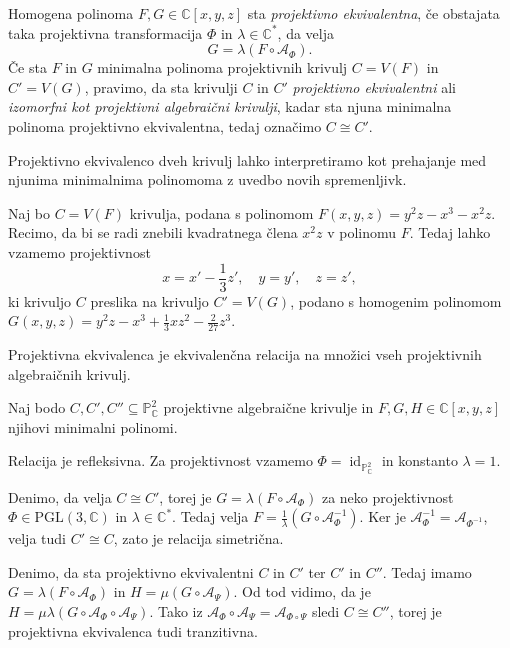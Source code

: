 \documentclass[mat1]{fmfdelo}
\numberwithin{equation}{section}
\newcommand{\C}{\mathbb C}
\newcommand{\CM}{\mathbb C ^*}
\newcommand{\PC}{\mathbb{P}^2_\C}
\newcommand{\Cxyz}{\C[x,y,z]}
\newcommand{\inv}{^{-1}}
\newcommand{\kom}[1]{
    \underline{//#1}
}
\DeclareMathOperator{\id}{id}
\theoremstyle{definition}
\begin{document}
\begin{definicija}
    Homogena polinoma $F,G \in \Cxyz$ sta \emph{projektivno ekvivalentna}, če obstajata taka projektivna transformacija $\Phi$ in $\lambda \in \CM$, da velja
    $$ G = \lambda (F \circ \mathcal{A}_\Phi). $$
    Če sta $F$ in $G$ minimalna polinoma projektivnih krivulj $C = V(F)$ in $C' = V(G)$, pravimo, da sta krivulji $C$ in $C'$ \emph{projektivno ekvivalentni} ali \emph{izomorfni kot projektivni algebraični krivulji}, kadar sta njuna minimalna polinoma projektivno ekvivalentna, tedaj označimo $C \cong C'$. 
\end{definicija}

Projektivno ekvivalenco dveh krivulj lahko interpretiramo kot prehajanje med njunima minimalnima polinomoma z uvedbo novih spremenljivk.

\begin{zgled*}
    \label{zgled projektivne ekviv.}
    Naj bo $C = V(F)$ krivulja, podana s polinomom $F(x,y,z) = y^2z - x^3 - x^2z$. Recimo, da bi se radi znebili kvadratnega člena $x^2z$ v polinomu $F$. Tedaj lahko vzamemo projektivnost 
    \[
        x = x' - \frac{1}{3}z', \quad y = y', \quad z = z',
    \]
    ki krivuljo $C$ preslika na krivuljo $C' = V(G)$, podano s homogenim polinomom $G(x,y,z) = y^2z - x^3 + \frac13 xz^2 - \frac{2}{27}z^3$. 
\end{zgled*}

\begin{trditev}
    Projektivna ekvivalenca je ekvivalenčna relacija na množici vseh projektivnih algebraičnih krivulj.
\end{trditev}

\begin{dokaz}
    Naj bodo $C, C', C'' \subseteq \PC$ projektivne algebraične krivulje in $F, G, H \in \Cxyz$ njihovi minimalni polinomi. 
    \par Relacija je refleksivna. Za projektivnost vzamemo $\Phi = \id_{\PC}$ in konstanto $\lambda = 1$. 
    \par Denimo, da velja $C \cong C'$, torej je $G = \lambda (F \circ \mathcal{A}_\Phi)$ za neko projektivnost $\Phi \in \operatorname{PGL(3, \C)}$ in $\lambda \in \CM$. Tedaj velja $F = \frac{1}{\lambda} (G \circ \mathcal{A}_\Phi\inv)$. Ker je $\mathcal{A}_\Phi\inv = \mathcal{A}_{\Phi\inv}$, velja tudi $C' \cong C$, zato je relacija simetrična. 
    \par Denimo, da sta projektivno ekvivalentni $C$ in $C'$ ter $C'$ in $C''$. Tedaj imamo $G = \lambda (F \circ \mathcal{A}_\Phi)$ in $H = \mu (G \circ \mathcal{A}_\Psi)$. Od tod vidimo, da je $H = \mu\lambda(G \circ \mathcal{A}_\Phi \circ \mathcal{A}_\Psi)$. Tako iz $\mathcal{A}_\Phi \circ \mathcal{A}_\Psi = \mathcal{A}_{\Phi \circ \Psi}$ sledi $C \cong C''$, torej je projektivna ekvivalenca tudi tranzitivna. 
\end{dokaz}
\end{document}
